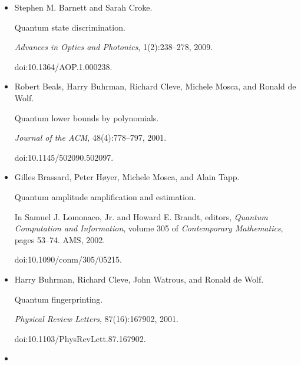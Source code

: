 \begin{itemize}
Stabilization of quantum computations by symmetrization.


\emph{SIAM Journal on Computing}, 26(5):1541–1557, 1997.


doi:10.1137/S0097539796302452.





\item[] 
[6]

Stephen M. Barnett and Sarah Croke.


Quantum state discrimination.


\emph{Advances in Optics and Photonics}, 1(2):238–278, 2009.


doi:10.1364/AOP.1.000238.





\item[] 
[7]

Robert Beals, Harry Buhrman, Richard Cleve, Michele Mosca, and Ronald de Wolf.


Quantum lower bounds by polynomials.


\emph{Journal of the ACM}, 48(4):778–797, 2001.


doi:10.1145/502090.502097.





\item[] 
[8]

Gilles Brassard, Peter Høyer, Michele Mosca, and Alain Tapp.


Quantum amplitude amplification and estimation.


In Samuel J. Lomonaco, Jr. and Howard E. Brandt, editors, \emph{Quantum Computation and Information}, volume 305 of \emph{Contemporary
Mathematics}, pages 53–74. AMS, 2002.


doi:10.1090/conm/305/05215.





\item[] 
[9]

Harry Buhrman, Richard Cleve, John Watrous, and Ronald de Wolf.


Quantum fingerprinting.


\emph{Physical Review Letters}, 87(16):167902, 2001.


doi:10.1103/PhysRevLett.87.167902.





\item[] 
[10]


\end{itemize}
